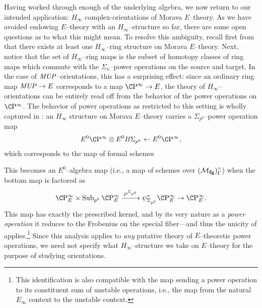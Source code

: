 Having worked through enough of the underlying algebra, we now return to our intended application: \(H_\infty\) complex-orientations of Morava \(E\)--theory.  As we have avoided endowing \(E\)--theory with an \(H_\infty\)--structure so far, there are some open questions as to what this might mean.  To resolve this ambiguity, recall first from  that there exists at least one \(H_\infty\)--ring structure on Morava \(E\)--theory.  Next, notice that the set of \(H_\infty\)--ring maps is the subset of homotopy classes of ring maps which commute with the \(\Sigma_n\)--power operations on the source and target.  In the case of \(\mathit{MUP}\)--orientations, this has a surprising effect: since an ordinary ring map \(\mathit{MUP} \to E\) corresponds to a map \(\CP^\infty \to E\), the theory of \(H_\infty\)--orientations can be entirely read off from the behavior of the power operations on \(\CP^\infty\).  The behavior of power operations as restricted to this setting is wholly captured in : an \(H_\infty\) structure on Morava \(E\)--theory carries a \(\Sigma_{p^k}\)--power operation map \[E^0 \CP^\infty \otimes E^0 B\Sigma_{p^k} \from E^0 \CP^\infty,\] which corresponds to the map of formal schemes
\begin{center}
\end{center}
This becomes an \(E^0\)--algebra map (i.e., a map of schemes over \((\mathcal{M}_{\mathbf{fg}})^\wedge_\Gamma\)) when the bottom map is factored as \[\CP^\infty_E \times \Sub_{p^k} \CP^\infty_E \xrightarrow{P^{\Sigma_{p^k}}} \psi_{\Sigma_{p^k}}^* \CP^\infty_E \to \CP^\infty_E.\]  This map has exactly the prescribed kernel, and by its very nature as a \emph{power operation} it reduces to the Frobenius on the special fiber---and thus the unicity of  applies.\footnote{This identification is also compatible with the map sending a power operation to its constituent sum of unstable operations, i.e., the map from the natural \(E_\infty\) context to the unstable context.}  Since this analysis applies to \emph{any} putative theory of \(E\)--theoretic power operations, we need not specify what \(H_\infty\)--structure we take on \(E\)--theory for the purpose of studying orientations.

